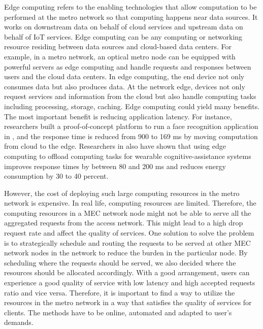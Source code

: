 \documentclass[conference]{IEEEtran}
\begin{document}
Edge computing refers to the enabling technologies that allow computation to be performed at the metro network so that computing happens near data sources. It works on downstream data on behalf of cloud services and upstream data on behalf of IoT services. Edge computing can be any computing or networking resource residing between data sources and cloud-based data centers. For example, in a metro network, an optical metro node can be equipped with powerful servers as edge computing and handle requests and responses between users and the cloud data centers. In edge computing, the end device not only consumes data but also produces data. At the network edge, devices not only request services and information from the cloud but also handle computing tasks including processing, storage, caching. Edge computing could yield many benefits. The most important benefit is reducing application latency. For instance, researchers built a proof-of-concept platform to run a face recognition application in \cite{7372286}, and the response time is reduced from 900 to 169 ms by moving computation from cloud to the edge. Researchers in \cite{5280678} also have shown that using edge computing to offload computing tasks for wearable cognitive-assistance systems improves response times by between 80 and 200 ms and reduces energy consumption by 30 to 40 percent.

However, the cost of deploying such large computing resources in the metro network is expensive. In real life, computing resources are limited. Therefore, the computing resources in a MEC network node might not be able to serve all the aggregated requests from the access network. This might lead to a high drop request rate and affect the quality of services. One solution to solve the problem is to strategically schedule and routing the requests to be served at other MEC network nodes in the network to reduce the burden in the particular node. By scheduling where the requests should be served, we also decided where the resources should be allocated accordingly. With a good arrangement, users can experience a good quality of service with low latency and high accepted requests ratio and vice versa. Therefore, it is important to find a way to utilize the resources in the metro network in a way that satisfies the quality of services for clients. The methods have to be online, automated and adapted to user's demands.
\end{document}
